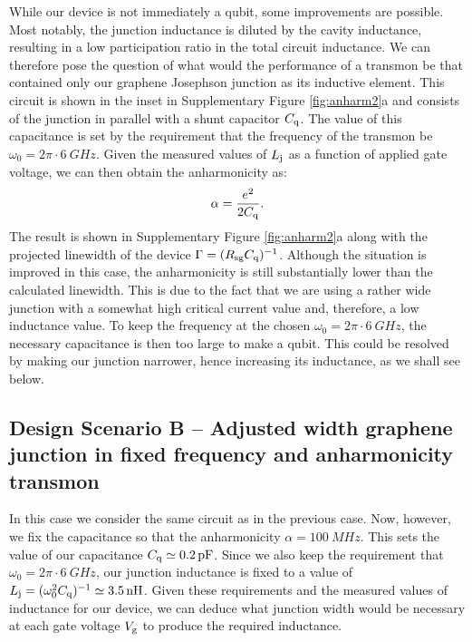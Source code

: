 While our device is not immediately a qubit, some improvements are possible.
Most notably, the junction inductance is diluted by the cavity inductance, resulting in a low participation ratio in the total circuit inductance.
We can therefore pose the question of what would the performance of a transmon be that contained only our graphene Josephson junction as its inductive element.
This circuit is shown in the inset in Supplementary Figure \ref{fig:anharm2}a and consists of the junction in parallel with a shunt capacitor $C_{\rm q}$.
The value of this capacitance is set by the requirement that the frequency of the transmon be $\omega_0 = 2\pi\cdot\SI{6}{GHz}$.
Given the measured values of $L_{\rm j}$ as a function of applied gate voltage, we can then obtain the anharmonicity as:
\begin{equation}
\alpha = \frac{e^2}{2C_{\rm q}}.
\end{equation}
The result is shown in Supplementary Figure \ref{fig:anharm2}a along with the projected linewidth of the device $\Gamma = (R_{\rm sg}C_{\rm q})^{-1}$.
Although the situation is improved in this case, the anharmonicity is still substantially lower than the calculated linewidth.
This is due to the fact that we are using a rather wide junction with a somewhat high critical current value and, therefore, a low inductance value.
To keep the frequency at the chosen $\omega_0 = 2\pi\cdot\SI{6}{GHz}$, the necessary capacitance is then too large to make a qubit.
This could be resolved by making our junction narrower, hence increasing its inductance, as we shall see below.



\subsection{Design Scenario B -- Adjusted width graphene junction in fixed frequency and anharmonicity transmon}\label{sec:scenB}

In this case we consider the same circuit as in the previous case.
Now, however, we fix the capacitance so that the anharmonicity $\alpha = \SI{100}{MHz}$.
This sets the value of our capacitance $C_{\rm q}\simeq\SI{0.2}{pF}$.
Since we also keep the requirement that $\omega_0 = 2\pi\cdot\SI{6}{GHz}$, our junction inductance is fixed to a value of $L_{\rm j} = (\omega_0^2C_{\rm q})^{-1} \simeq \SI{3.5}{nH}$.  
Given these requirements and the measured values of inductance for our device, we can deduce what junction width would be necessary at each gate voltage $V_{\rm g}$ to produce the required inductance.

